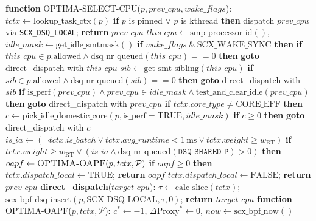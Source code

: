 \documentclass[conference]{IEEEtran}
\begin{document}
\begin{algorithm}[t]
\caption{OPTIMA CPU Selection \& Online Admissible Preemption Filter (OAPF)}
\label{alg:select_cpu}\label{alg:oapf}
\begin{algorithmic}[1]
\scriptsize\setlength{\itemsep}{0pt}
\STATE \textbf{function} \textsc{OPTIMA-SELECT-CPU}($p, prev\_cpu, wake\_flags$):
\STATE \quad $tctx \leftarrow \text{lookup\_task\_ctx}(p)$
\STATE \quad \textbf{if} $p$ is pinned $\lor$ $p$ is kthread \textbf{then} dispatch $prev\_cpu$ via \texttt{SCX\_DSQ\_LOCAL}; \textbf{return} $prev\_cpu$
\STATE \quad $this\_cpu \leftarrow \text{smp\_processor\_id}()$, $idle\_mask \leftarrow \text{get\_idle\_smtmask}()$
\STATE \quad \textbf{if} $wake\_flags \ \& \ \text{SCX\_WAKE\_SYNC}$ \textbf{then}
\STATE \quad \quad \textbf{if} $this\_cpu \in p.\text{allowed} \land \text{dsq\_nr\_queued}(this\_cpu) == 0$ \textbf{then} \textbf{goto} direct\_dispatch with $this\_cpu$
\STATE \quad \quad $sib \leftarrow \text{get\_smt\_sibling}(this\_cpu)$
\STATE \quad \quad \textbf{if} $sib \in p.\text{allowed} \land \text{dsq\_nr\_queued}(sib) == 0$ \textbf{then} \textbf{goto} direct\_dispatch with $sib$
\STATE \quad \textbf{if} $\text{is\_perf}(prev\_cpu) \land prev\_cpu \in idle\_mask \land \text{test\_and\_clear\_idle}(prev\_cpu)$ \textbf{then}
\STATE \quad \quad \textbf{goto} direct\_dispatch with $prev\_cpu$
\STATE \quad \textbf{if} $tctx.core\_type \ne \text{CORE\_EFF}$ \textbf{then}
\STATE \quad \quad $c \leftarrow \text{pick\_idle\_domestic\_core}(p, \text{is\_perf}=\text{TRUE}, idle\_mask)$
\STATE \quad \quad \textbf{if} $c \ge 0$ \textbf{then} \textbf{goto} direct\_dispatch with $c$
\STATE \quad $is\_ia \leftarrow (\neg tctx.is\_batch \lor tctx.avg\_runtime < 1\,\mathrm{ms} \lor tctx.weight \ge w_{\mathrm{RT}})$
\STATE \quad \textbf{if} $tctx.weight \ge w_{\mathrm{RT}} \lor (is\_ia \land \text{dsq\_nr\_queued}(\texttt{DSQ\_SHARED\_P}) > 0)$ \textbf{then}
\STATE \quad \quad $oapf \leftarrow \textsc{OPTIMA-OAPF}(p, tctx, \mathcal{P})$
\STATE \quad \quad \textbf{if} $oapf \ge 0$ \textbf{then} $tctx.dispatch\_local \leftarrow \text{TRUE}$; \textbf{return} $oapf$
\STATE \quad $tctx.dispatch\_local \leftarrow \text{FALSE}$; \textbf{return} $prev\_cpu$
\STATE \quad \textbf{direct\_dispatch}($target\_cpu$): $\tau \leftarrow \text{calc\_slice}(tctx)$; $\text{scx\_bpf\_dsq\_insert}(p, \text{SCX\_DSQ\_LOCAL}, \tau, 0)$; \textbf{return} $target\_cpu$
\STATE \textbf{function} \textsc{OPTIMA-OAPF}($p, tctx, \mathcal{P}$):
\STATE \quad $c^* \leftarrow -1$, $\Delta\mathrm{Proxy}^* \leftarrow 0$, $now \leftarrow \text{scx\_bpf\_now}()$

\end{algorithmic}
\end{algorithm}
\end{document}
